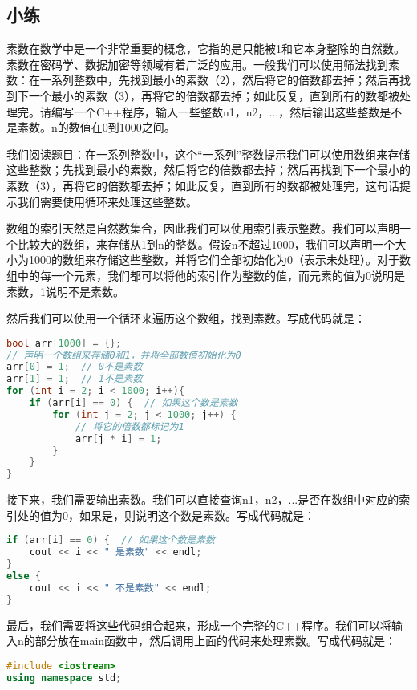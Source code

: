 \documentclass[../main.tex]{subfiles}
\begin{document}
\subsection{小练}

\begin{example}
  素数在数学中是一个非常重要的概念，它指的是只能被1和它本身整除的自然数。素数在密码学、数据加密等领域有着广泛的应用。一般我们可以使用筛法找到素数：在一系列整数中，先找到最小的素数（2），然后将它的倍数都去掉；然后再找到下一个最小的素数（3），再将它的倍数都去掉；如此反复，直到所有的数都被处理完。请编写一个C++程序，输入一些整数n1，n2，...，然后输出这些整数是不是素数。n的数值在0到1000之间。
\end{example}

\begin{answer}
  我们阅读题目：在一系列整数中，这个“一系列”整数提示我们可以使用数组来存储这些整数；先找到最小的素数，然后将它的倍数都去掉；然后再找到下一个最小的素数（3），再将它的倍数都去掉；如此反复，直到所有的数都被处理完，这句话提示我们需要使用循环来处理这些整数。

  数组的索引天然是自然数集合，因此我们可以使用索引表示整数。我们可以声明一个比较大的数组，来存储从1到n的整数。假设n不超过1000，我们可以声明一个大小为1000的数组来存储这些整数，并将它们全部初始化为0（表示未处理）。对于数组中的每一个元素，我们都可以将他的索引作为整数的值，而元素的值为0说明是素数，1说明不是素数。

  然后我们可以使用一个循环来遍历这个数组，找到素数。写成代码就是：
\begin{lstlisting}[language=C++]
bool arr[1000] = {};
// 声明一个数组来存储0和1，并将全部数值初始化为0
arr[0] = 1;  // 0不是素数
arr[1] = 1;  // 1不是素数
for (int i = 2; i < 1000; i++){
    if (arr[i] == 0) {  // 如果这个数是素数
        for (int j = 2; j < 1000; j++) {
            // 将它的倍数都标记为1
            arr[j * i] = 1;
        }
    }
}
\end{lstlisting}

  接下来，我们需要输出素数。我们可以直接查询n1，n2，...是否在数组中对应的索引处的值为0，如果是，则说明这个数是素数。写成代码就是：
\begin{lstlisting}[language=C++]
if (arr[i] == 0) {  // 如果这个数是素数
    cout << i << " 是素数" << endl;
}
else {
    cout << i << " 不是素数" << endl;
}
\end{lstlisting}
  最后，我们需要将这些代码组合起来，形成一个完整的C++程序。我们可以将输入n的部分放在main函数中，然后调用上面的代码来处理素数。写成代码就是：
\begin{lstlisting}[language=C++]
#include <iostream>
using namespace std;


\end{lstlisting}
\end{answer}
\end{document}
